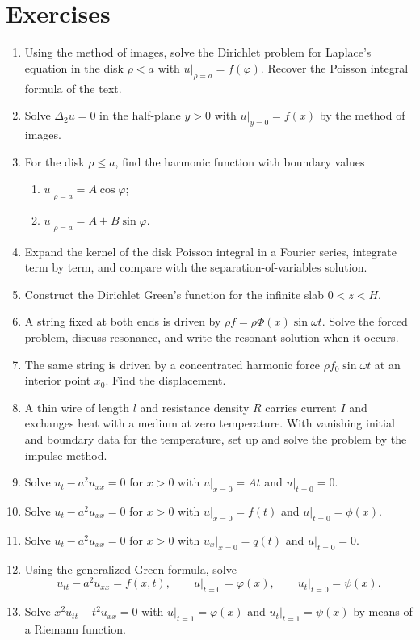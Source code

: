 \section{Exercises}

\begin{enumerate}
\item Using the method of images, solve the Dirichlet problem for Laplace's equation in the disk $\rho<a$ with $u|_{\rho=a}=f(\varphi)$. Recover the Poisson integral formula of the text.

\item Solve $\Delta_2 u=0$ in the half-plane $y>0$ with $u|_{y=0}=f(x)$ by the method of images.

\item For the disk $\rho\le a$, find the harmonic function with boundary values
\begin{enumerate}
\item $u|_{\rho=a}=A\cos\varphi$;
\item $u|_{\rho=a}=A+B\sin\varphi$.
\end{enumerate}

\item Expand the kernel of the disk Poisson integral in a Fourier series, integrate term by term, and compare with the separation-of-variables solution.

\item Construct the Dirichlet Green's function for the infinite slab $0<z<H$.

\item A string fixed at both ends is driven by $\rho f=\rho\Phi(x)\sin\omega t$. Solve the forced problem, discuss resonance, and write the resonant solution when it occurs.

\item The same string is driven by a concentrated harmonic force $\rho f_0\sin\omega t$ at an interior point $x_0$. Find the displacement.

\item A thin wire of length $l$ and resistance density $R$ carries current $I$ and exchanges heat with a medium at zero temperature. With vanishing initial and boundary data for the temperature, set up and solve the problem by the impulse method.

\item Solve $u_t-a^2 u_{xx}=0$ for $x>0$ with $u|_{x=0}=At$ and $u|_{t=0}=0$.

\item Solve $u_t-a^2 u_{xx}=0$ for $x>0$ with $u|_{x=0}=f(t)$ and $u|_{t=0}=\phi(x)$.

\item Solve $u_t-a^2 u_{xx}=0$ for $x>0$ with $u_x|_{x=0}=q(t)$ and $u|_{t=0}=0$.

\item Using the generalized Green formula, solve
\begin{equation}
u_{tt}-a^2 u_{xx}=f(x,t),
\qquad
u\big|_{t=0}=\varphi(x),
\qquad
u_t\big|_{t=0}=\psi(x).
\end{equation}

\item Solve $x^2 u_{tt}-t^2 u_{xx}=0$ with $u|_{t=1}=\varphi(x)$ and $u_t|_{t=1}=\psi(x)$ by means of a Riemann function.
\end{enumerate}
